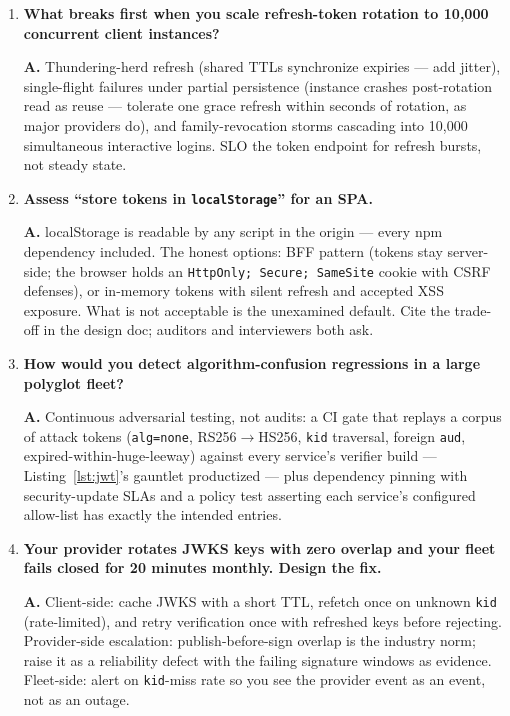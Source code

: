 \begin{enumerate}[label=\textbf{Q\arabic*.}, leftmargin=1.7cm, itemsep=0.9em, start=23]
  \item \textbf{What breaks first when you scale refresh-token rotation to
        10{,}000 concurrent client instances?}\par
        \textbf{A.} Thundering-herd refresh (shared TTLs synchronize
        expiries --- add jitter), single-flight failures under partial
        persistence (instance crashes post-rotation read as reuse ---
        tolerate one grace refresh within seconds of rotation, as major
        providers do), and family-revocation storms cascading into 10{,}000
        simultaneous interactive logins. SLO the token endpoint for refresh
        bursts, not steady state.
  \item \textbf{Assess ``store tokens in \texttt{localStorage}'' for an
        SPA.}\par
        \textbf{A.} localStorage is readable by any script in the origin ---
        every npm dependency included. The honest options: BFF pattern
        (tokens stay server-side; the browser holds an
        \texttt{HttpOnly; Secure; SameSite} cookie with CSRF defenses), or
        in-memory tokens with silent refresh and accepted XSS exposure. What
        is not acceptable is the unexamined default. Cite the trade-off in
        the design doc; auditors and interviewers both ask.
  \item \textbf{How would you detect algorithm-confusion regressions in a
        large polyglot fleet?}\par
        \textbf{A.} Continuous adversarial testing, not audits: a CI gate
        that replays a corpus of attack tokens (\texttt{alg=none},
        RS256$\rightarrow$HS256, \texttt{kid} traversal, foreign
        \texttt{aud}, expired-within-huge-leeway) against every service's
        verifier build --- Listing~\ref{lst:jwt}'s gauntlet productized ---
        plus dependency pinning with security-update SLAs and a policy test
        asserting each service's configured allow-list has exactly the
        intended entries.
  \item \textbf{Your provider rotates JWKS keys with zero overlap and your
        fleet fails closed for 20 minutes monthly. Design the fix.}\par
        \textbf{A.} Client-side: cache JWKS with a short TTL, refetch once
        on unknown \texttt{kid} (rate-limited), and retry verification once
        with refreshed keys before rejecting. Provider-side escalation:
        publish-before-sign overlap is the industry norm; raise it as a
        reliability defect with the failing signature windows as evidence.
        Fleet-side: alert on \texttt{kid}-miss rate so you see the provider
        event as an event, not as an outage.
\end{enumerate}

